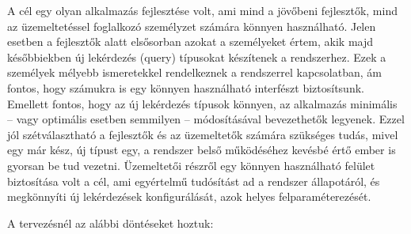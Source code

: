 A cél egy olyan alkalmazás fejlesztése volt, ami mind a jövőbeni fejlesztők, mind az üzemeltetéssel foglalkozó személyzet számára könnyen használható. Jelen esetben a fejlesztők alatt elsősorban azokat a személyeket értem, akik majd későbbiekben új lekérdezés (query) típusokat készítenek a rendszerhez. Ezek a személyek mélyebb ismeretekkel rendelkeznek a rendszerrel kapcsolatban, ám fontos, hogy számukra is egy könnyen használható interfészt biztosítsunk. Emellett fontos, hogy az új lekérdezés típusok könnyen, az alkalmazás minimális -- vagy optimális esetben semmilyen -- módosításával bevezethetők legyenek. Ezzel jól szétválasztható a fejlesztők és az üzemeltetők számára szükséges tudás, mivel egy már kész, új típust egy, a rendszer belső működéséhez kevésbé értő ember is gyorsan be tud vezetni. Üzemeltetői részről egy könnyen használható felület biztosítása volt a cél, ami egyértelmű tudósítást ad a rendszer állapotáról, és megkönnyíti új lekérdezések konfigurálását, azok helyes felparaméterezését.

A tervezésnél az alábbi döntéseket hoztuk:

